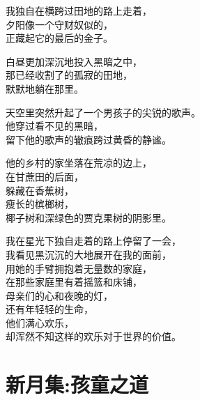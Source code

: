 \documentclass[
]{book}
\renewenvironment{quote}{\begin{VF}}{\end{VF}}
\begin{document}
\begin{quote}
我独自在横跨过田地的路上走着，\\
夕阳像一个守财奴似的，\\
正藏起它的最后的金子。

白昼更加深沉地投入黑暗之中，\\
那已经收割了的孤寂的田地，\\
默默地躺在那里。

天空里突然升起了一个男孩子的尖锐的歌声。\\
他穿过看不见的黑暗，\\
留下他的歌声的辙痕跨过黄昏的静谧。

他的乡村的家坐落在荒凉的边上，\\
在甘蔗田的后面，\\
躲藏在香蕉树，\\
瘦长的槟榔树，\\
椰子树和深绿色的贾克果树的阴影里。

我在星光下独自走着的路上停留了一会，\\
我看见黑沉沉的大地展开在我的面前，\\
用她的手臂拥抱着无量数的家庭，\\
在那些家庭里有着摇篮和床铺，\\
母亲们的心和夜晚的灯，\\
还有年轻轻的生命，\\
他们满心欢乐，\\
却浑然不知这样的欢乐对于世界的价值。
\end{quote}

\hypertarget{section-34}{%
\section{新月集:孩童之道}\label{section-34}}
\end{document}
